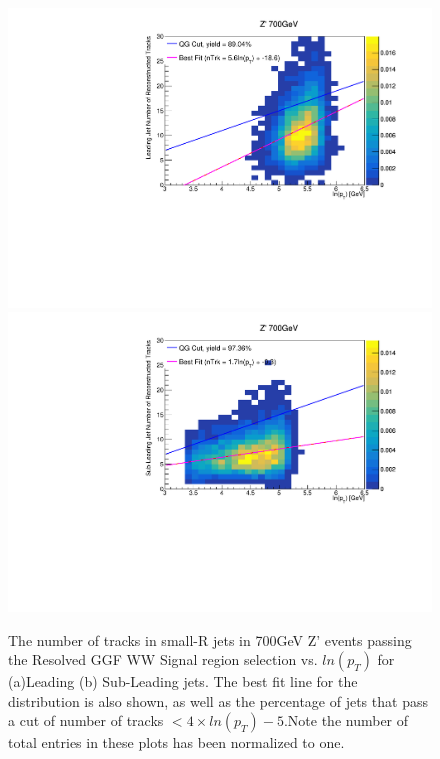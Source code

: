 \begin{figure}[h!]
  \centering
  \includegraphics[width=0.45\hsize]{figures/QGT/HVTWW_700_1lep_Pass_Res_GGF_WW_SR_sigWJ1_nTrk.pdf}
 \includegraphics[width=0.45\hsize]{figures/QGT/HVTWW_700_1lep_Pass_Res_GGF_WW_SR_sigWJ2_nTrk.pdf}
  \caption{The number of tracks in small-R jets in 700GeV Z' events passing the Resolved GGF WW Signal region selection vs. $ln(p_{T})$ for (a)Leading (b) Sub-Leading jets. The best fit line for the distribution is also shown, as well as the percentage of jets that pass a cut of number of tracks $< 4\times ln(p_{T}) -5$.Note the number of total entries in these plots has been normalized to one.}
  \label{fig:sig700_heatmap}
\end{figure}
\FloatBarrier


